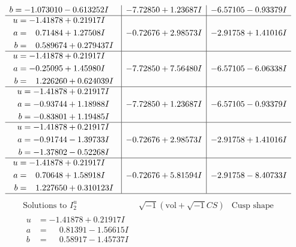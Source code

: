 \documentclass[1p]{elsarticle_modified}
\theoremstyle{definition}
\newcommand{\I}{\sqrt{-1}}
\begin{document}
$$\begin{array}{c|c|c}
\begin{aligned}
b &= -1.073010 - 0.613252 I\end{aligned}
 & -7.72850 + 1.23687 I & -6.57105 - 0.93379 I \\ \hline\begin{aligned}
u &= -1.41878 + 0.21917 I \\
a &= \phantom{-}0.71484 + 1.27508 I \\
b &= \phantom{-}0.589674 + 0.279437 I\end{aligned}
 & -0.72676 + 2.98573 I & -2.91758 + 1.41016 I \\ \hline\begin{aligned}
u &= -1.41878 + 0.21917 I \\
a &= -0.25095 + 1.45980 I \\
b &= \phantom{-}1.226260 + 0.624039 I\end{aligned}
 & -7.72850 + 7.56480 I & -6.57105 - 6.06338 I \\ \hline\begin{aligned}
u &= -1.41878 + 0.21917 I \\
a &= -0.93744 + 1.18988 I \\
b &= -0.83801 + 1.19485 I\end{aligned}
 & -7.72850 + 1.23687 I & -6.57105 - 0.93379 I \\ \hline\begin{aligned}
u &= -1.41878 + 0.21917 I \\
a &= -0.91744 - 1.39733 I \\
b &= -1.37802 - 0.52268 I\end{aligned}
 & -0.72676 + 2.98573 I & -2.91758 + 1.41016 I \\ \hline\begin{aligned}
u &= -1.41878 + 0.21917 I \\
a &= \phantom{-}0.70648 + 1.58918 I \\
b &= \phantom{-}1.227650 + 0.310123 I\end{aligned}
 & -0.72676 + 5.81594 I & -2.91758 - 8.40733 I\\
 \hline 
 \end{array}$$\newpage$$\begin{array}{c|c|c}  
\text{Solutions to }I^u_{2}& \I (\text{vol} + \sqrt{-1}CS) & \text{Cusp shape}\\
 \hline 
\begin{aligned}
u &= -1.41878 + 0.21917 I \\
a &= \phantom{-}0.81391 - 1.56615 I \\
b &= \phantom{-}0.58917 - 1.45737 I\end{aligned}

\end{array}$$
\end{document}
